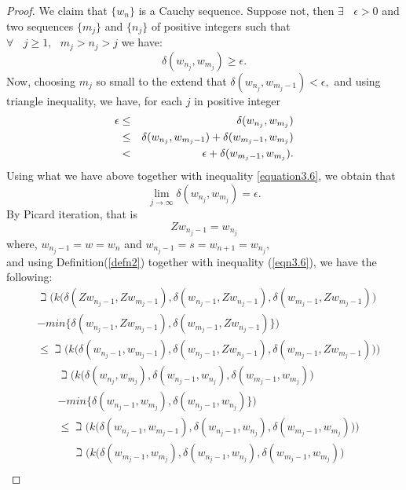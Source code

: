 \documentclass[10pt,a4paper]{amsart}
\begin{document}
\begin{proof}
		We claim that $\{w_{n}\}$ is a Cauchy sequence. Suppose not, then $\exists~~~~ \epsilon >0$ and two sequences $\{m_{j}\}$ and $\{n_{j}\}$ of positive integers such that $ \forall~~~~ j \geq 1,~~~m_j > n_j > j$ we have:
		\begin{equation*}
		\delta(w_{n_j},w_{m_j})\geq \epsilon.
		\end{equation*}
		Now, choosing $m_j$ so small to the extend that $\delta(w_{n_j},w_{m_j-1})< \epsilon,$ and using triangle inequality, we have, for each $j$ in positive integer
		\begin{eqnarray}
		\epsilon &\leq& \delta(w_{n_j},w_{m_j})\notag\\
		&\leq& \delta(w_{n_j},w_{m_j-1}) + \delta(w_{m_j-1},w_{m_j})\notag\\
		&<& \epsilon + \delta(w_{m_j-1},w_{m_j}).
		\end{eqnarray} 
		Using what we have above together with inequality \ref{equation3.6}, we obtain that
		\begin{equation*}
		\lim_{j \to \infty} \delta(w_{n_j},w_{m_j}) = \epsilon.
		\end{equation*}
		By Picard iteration, that is
		$$Zw_{n_j-1} = w_{n_j}$$
		where, $w_{n_j-1} = w= w_{n}$ and $w_{n_j-1} =s=w_{n+1}= w_{n_j},$\\
		and using Definition(\ref{defn2}) together with inequality (\ref{eqn3.6}), we have the following:
		\begin{eqnarray*}
		&\beth \Big(k\Big(\delta(Zw_{n_j-1},Zw_{m_j-1}),\delta(w_{n_j-1},Zw_{n_j-1}), \delta(w_{m_j-1},Zw_{m_j-1})\Big)\\
		&- min\{ \delta(w_{n_j-1},Zw_{m_j-1}), \delta(w_{m_j-1},Zw_{n_j-1})\}\Big)\\
		&\leq \beth\Big(k\Big(\delta(w_{n_j-1},w_{m_j-1}), \delta(w_{n_j-1},Zw_{n_j-1}), \delta(w_{m_j-1},Zw_{m_j-1})\Big)\Big)
		\end{eqnarray*}
		\begin{eqnarray*}
			&\beth \Big(k\Big(\delta(w_{n_j},w_{m_j}),\delta(w_{n_j-1},w_{n_j}), \delta(w_{m_j-1},w_{m_j})\Big)\\
			&- min\{ \delta(w_{n_j-1},w_{m_j}), \delta(w_{n_j-1},w_{n_j})\}\Big)\\
			&\leq \beth\Big(k\Big(\delta(w_{n_j-1},w_{m_j-1}), \delta(w_{n_j-1},w_{n_j}), \delta(w_{m_j-1},w_{m_j})\Big)\Big)
		\end{eqnarray*}
		\begin{eqnarray*}
			&\beth \Big(k\Big(\delta(w_{m_j-1},w_{m_j}),\delta(w_{n_j-1},w_{n_j}), \delta(w_{m_j-1},w_{m_j})\Big)\\

\end{eqnarray*}
\end{proof}
\end{document}

